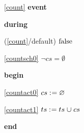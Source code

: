 \noindent \ref{count}  \textbf{event}
\begin{block}
  \item   \textbf{during}
  \begin{block}
  \item[ (\ref{count}/default) ]\sout{$\text{false}$} %
  \end{block}
  \begin{block}
  \item[ \eqref{countsch0} ]{$\neg cs = \emptyset $} %
  \end{block}
  \item   \textbf{begin}
  \begin{block}
  \item[ \eqref{countact0} ]{$cs \mathrel{:\mkern1mu=} \mathord\varnothing$} %
  \item[ \eqref{countact1} ]{$ts \mathrel{:\mkern1mu=} ts \mathbin{\mkern1mu\cup\mkern1mu} cs $} %
  \end{block}
  \item   \textbf{end} \\
\end{block}
